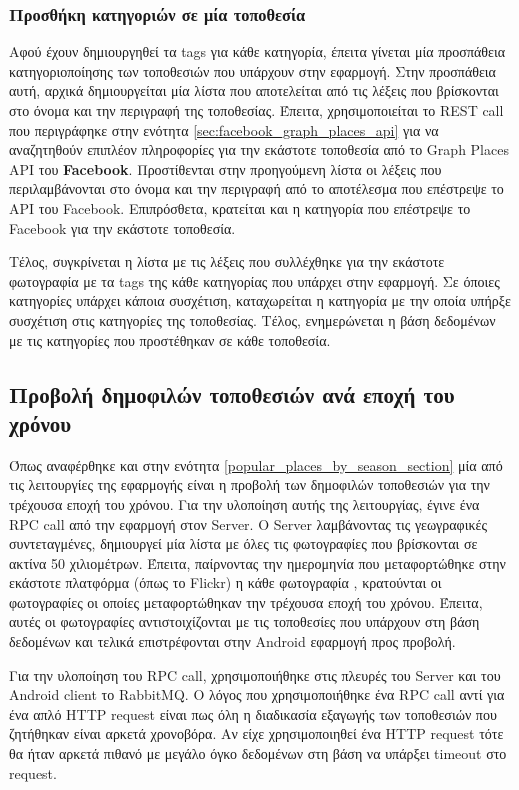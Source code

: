 \documentclass[oneside, 12pt]{book}
\begin{document}
\subsubsection{Προσθήκη κατηγοριών σε μία τοποθεσία}
Αφού έχουν δημιουργηθεί τα tags για κάθε κατηγορία, έπειτα γίνεται 
μία προσπάθεια κατηγοριοποίησης των τοποθεσιών που υπάρχουν στην 
εφαρμογή. 
Στην προσπάθεια αυτή, αρχικά δημιουργείται μία λίστα που αποτελείται από τις λέξεις που βρίσκονται στο όνομα και την περιγραφή 
της τοποθεσίας. Έπειτα, χρησιμοποιείται το REST call που 
περιγράφηκε στην ενότητα \ref{sec:facebook_graph_places_api} για να 
αναζητηθούν επιπλέον πληροφορίες για την εκάστοτε τοποθεσία από το 
Graph Places API του \textbf{Facebook}. Προστίθενται στην 
προηγούμενη λίστα οι λέξεις που περιλαμβάνονται στο όνομα και την 
περιγραφή από το αποτέλεσμα που επέστρεψε το API του Facebook. 
Επιπρόσθετα, κρατείται και η κατηγορία που επέστρεψε το Facebook 
για την εκάστοτε τοποθεσία. 

Τέλος, συγκρίνεται η λίστα με τις 
λέξεις που συλλέχθηκε για την εκάστοτε φωτογραφία με τα tags της 
κάθε κατηγορίας που υπάρχει στην εφαρμογή. Σε όποιες κατηγορίες 
υπάρχει κάποια συσχέτιση, καταχωρείται η κατηγορία με την οποία 
υπήρξε συσχέτιση στις κατηγορίες της τοποθεσίας.
Τέλος, ενημερώνεται η βάση δεδομένων με τις κατηγορίες που 
προστέθηκαν σε κάθε τοποθεσία. 

\subsection{Προβολή δημοφιλών τοποθεσιών ανά εποχή του χρόνου}
Όπως αναφέρθηκε και στην ενότητα \ref{popular_places_by_season_section} μία από τις λειτουργίες της 
εφαρμογής είναι η προβολή των δημοφιλών τοποθεσιών για την τρέχουσα 
εποχή του χρόνου.
Για την υλοποίηση αυτής της λειτουργίας, έγινε ένα RPC call από την 
εφαρμογή στον Server. 
Ο Server λαμβάνοντας τις γεωγραφικές συντεταγμένες, δημιουργεί μία 
λίστα με όλες τις φωτογραφίες που βρίσκονται σε ακτίνα 50 
χιλιομέτρων. 
Έπειτα, παίρνοντας την ημερομηνία που μεταφορτώθηκε στην εκάστοτε 
πλατφόρμα (όπως το Flickr) η κάθε φωτογραφία , κρατούνται οι 
φωτογραφίες οι οποίες μεταφορτώθηκαν την τρέχουσα εποχή του χρόνου. 
Έπειτα, αυτές οι φωτογραφίες αντιστοιχίζονται με τις τοποθεσίες που 
υπάρχουν στη βάση δεδομένων και τελικά επιστρέφονται στην Android 
εφαρμογή προς προβολή.

Για την υλοποίηση του RPC call, χρησιμοποιήθηκε στις πλευρές του 
Server και του Android client το RabbitMQ. 
Ο λόγος που χρησιμοποιήθηκε ένα RPC call αντί για ένα απλό HTTP 
request είναι πως όλη η διαδικασία εξαγωγής των τοποθεσιών που 
ζητήθηκαν είναι αρκετά χρονοβόρα. 
Αν είχε χρησιμοποιηθεί ένα HTTP request τότε θα ήταν αρκετά πιθανό με μεγάλο όγκο δεδομένων στη βάση να υπάρξει timeout στο request.
\end{document}
